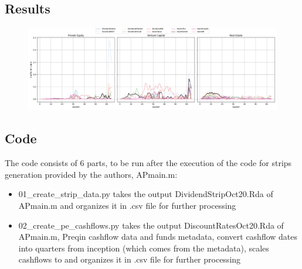 \documentclass[12pt]{article}
\begin{document}
    \subsection{Results}\label{subsec:results}
    \begin{figure}[h!]
        \label{fig:betas}
        \centering
        \includegraphics[width=0.9\linewidth]{img/img_1}
    \end{figure}

    \subsection{Code}
    The code consists of 6 parts, to be run after the execution of the code for strips generation provided by the authors, APmain.m:
    \begin{itemize}
        \item 01\_create\_strip\_data.py takes the output DividendStripOct20.Rda of APmain.m and organizes it in .csv file for further processing
        \item 02\_create\_pe\_cashflows.py takes the output DiscountRatesOct20.Rda of APmain.m, Preqin cashflow data and funds metadata, convert cashflow dates into quarters from inception (which comes from the metadata), scales cashflows to  and organizes it in .csv file for further processing

    \end{itemize}
\end{document}

